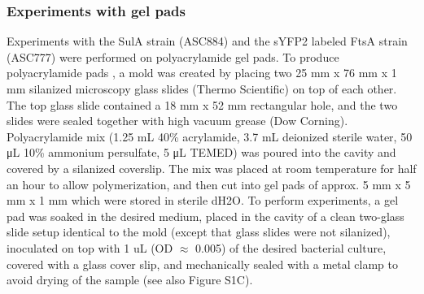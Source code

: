 \subsubsection{Experiments with gel pads}
Experiments with the SulA strain (ASC884) and the sYFP2 labeled FtsA strain (ASC777) were performed on polyacrylamide gel pads. To produce polyacrylamide pads \cite{Kiviet2014}, a mold was created by placing two 25 mm x 76 mm x 1 mm silanized microscopy glass slides (Thermo Scientific) on top of each other. The top glass slide contained a 18 mm x 52 mm rectangular hole, and the two slides were sealed together with high vacuum grease (Dow Corning). 
Polyacrylamide mix (1.25 mL 40\% acrylamide, 3.7 mL deionized sterile water, 50 μL 10\% ammonium persulfate, 5 μL TEMED) was poured into the cavity and covered by a silanized coverslip. 
The mix was placed at room temperature for half an hour to allow polymerization, and then cut into gel pads of approx. 5 mm x 5 mm x 1 mm which were stored in sterile dH2O. 
To perform experiments, a gel pad was soaked in the desired medium, placed in the cavity of a clean two-glass slide setup identical to the mold (except that glass slides were not silanized), inoculated on top with 1 uL (OD $\approx$ 0.005) of the desired bacterial culture, covered with a glass cover slip, and mechanically sealed with a metal clamp to avoid drying of the sample (see also Figure S1C).

